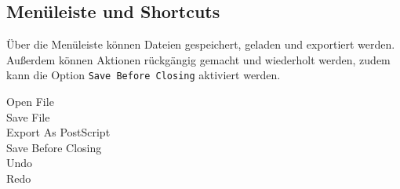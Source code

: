 \subsection{Menüleiste und Shortcuts}
\label{subsec:dateioperationen}

Über die Menüleiste können Dateien gespeichert, geladen und exportiert werden. Außerdem können Aktionen rückgängig gemacht und wiederholt werden, zudem kann die Option \texttt{Save Before Closing} aktiviert werden.

\begin{description}
  \item [Open File]
  \item [Save File] 
  \item [Export As PostScript]
  \item [Save Before Closing]
  \item [Undo]
  \item [Redo]
\end{description}